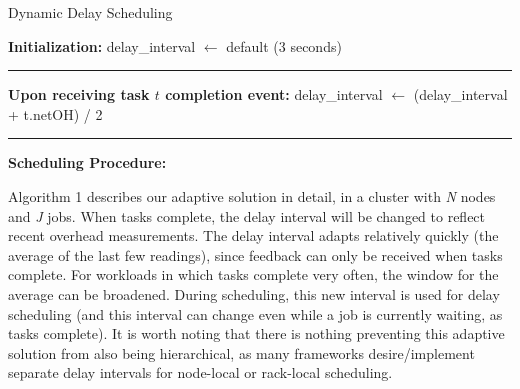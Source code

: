 \begin{algorithm}[]
    \footnotesize
    \DontPrintSemicolon
    \caption{Dynamic Delay Scheduling}
    \textbf{Initialization:}\;
    delay\_interval $\leftarrow$ default (3 seconds)\;
    \hrule width 0.4\textwidth
    \;
    \textbf{Upon receiving task $t$ completion event:}\;
    delay\_interval $\leftarrow$ (delay\_interval + t.netOH) / 2\;
    \hrule width 0.4\textwidth
    \;
    \textbf{Scheduling Procedure:}\;
\end{algorithm}


Algorithm 1 describes our adaptive solution in detail, in a cluster with \textit{N} nodes and \textit{J} jobs. 
When tasks complete, the delay interval will be changed to reflect 
recent overhead measurements. The delay interval adapts relatively quickly (the average of
the last few readings), since feedback can only be received when tasks complete. For workloads
in which tasks complete very often, the window for the average can be broadened. 
During scheduling, this new interval is used for delay scheduling (and this interval can 
change even while a job is currently waiting, as tasks complete). It is worth noting that 
there is nothing preventing this adaptive solution from also being hierarchical, as many 
frameworks desire/implement separate delay intervals for node-local or rack-local scheduling.

